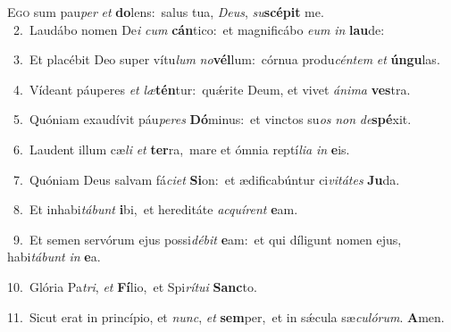 \lettrine{\initial\textcolor{\initialcolor}{E}}{go} sum pau\textit{per} \textit{et} \textbf{do}\-lens:~\star salus tua, \textit{De}\-\textit{us}, \textit{su}\-\textbf{scé}\textbf{pit} me.\\
{\numbfont\textcolor{\numbcolor}{~2.}}~Laudábo nomen De\textit{i} \textit{cum} \textbf{cán}\-tico:~\star et magnificábo \textit{e}\-\textit{um} \textit{in} \textbf{lau}\-de:\par
{\numbfont\textcolor{\numbcolor}{~3.}}~Et placébit Deo super vítu\textit{lum} \textit{no}\-\textbf{vél}lum:~\star córnua produ\-\textit{cén}\-\textit{tem} \textit{et} \textbf{ún}\-\textbf{gu}las.\par
{\numbfont\textcolor{\numbcolor}{~4.}}~Vídeant páuperes \textit{et} \textit{læ}\-\textbf{tén}tur:~\star quǽrite Deum, et vivet \textit{á}\-\textit{ni}\textit{ma} \textbf{ves}\-tra.\par
{\numbfont\textcolor{\numbcolor}{~5.}}~Quóniam exaudívit páu\-\textit{pe}\-\textit{res} \textbf{Dó}\-minus:~\star et vinctos su\textit{os} \textit{non} \textit{de}\-\textbf{spé}xit.\par
{\numbfont\textcolor{\numbcolor}{~6.}}~Laudent illum cæ\textit{li} \textit{et} \textbf{ter}\-ra,~\star mare et ómnia reptí\-\textit{li}\-\textit{a} \textit{in} \textbf{e}\-is.\par
{\numbfont\textcolor{\numbcolor}{~7.}}~Quóniam Deus salvam fá\-\textit{ci}\-\textit{et} \textbf{Si}\-on:~\star et ædificabúntur ci\-\textit{vi}\-\textit{tá}\textit{tes} \textbf{Ju}\-da.\par
{\numbfont\textcolor{\numbcolor}{~8.}}~Et inhabi\-\textit{tá}\-\textit{bunt} \textbf{i}\-bi,~\star et hereditáte \textit{ac}\-\textit{quí}\textit{rent} \textbf{e}\-am.\par
{\numbfont\textcolor{\numbcolor}{~9.}}~Et semen servórum ejus possi\-\textit{dé}\-\textit{bit} \textbf{e}\-am:~\star et qui díligunt nomen ejus, habi\-\textit{tá}\-\textit{bunt} \textit{in} \textbf{e}\-a.\par
{\numbfont\textcolor{\numbcolor}{10.}}~Glória Pa\-\textit{tri}\-, \textit{et} \textbf{Fí}\-lio,~\star et Spi\-\textit{rí}\-\textit{tu}\textit{i} \textbf{Sanc}\-to.\par
{\numbfont\textcolor{\numbcolor}{11.}}~Sicut erat in princípio, et \textit{nunc}\-, \textit{et} \textbf{sem}\-per,~\star et in sǽcula sæ\-\textit{cu}\-\textit{ló}\textit{rum}. \textbf{A}\-men.\par

